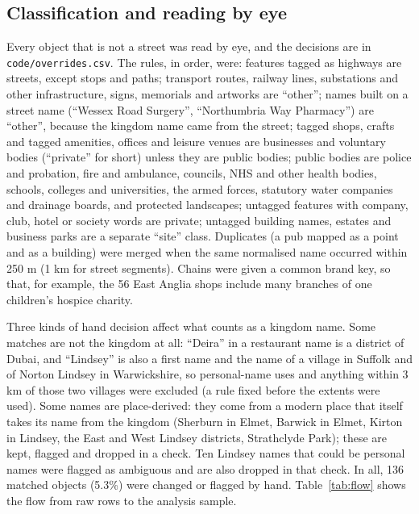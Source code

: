\documentclass[11pt,a4paper]{article}
\begin{document}
\subsection{Classification and reading by eye}
Every object that is not a street was read by eye, and the decisions are in \texttt{code/overrides.csv}. The rules, in order, were: features tagged as highways are streets, except stops and paths; transport routes, railway lines, substations and other infrastructure, signs, memorials and artworks are ``other''; names built on a street name (``Wessex Road Surgery'', ``Northumbria Way Pharmacy'') are ``other'', because the kingdom name came from the street; tagged shops, crafts and tagged amenities, offices and leisure venues are businesses and voluntary bodies (``private'' for short) unless they are public bodies; public bodies are police and probation, fire and ambulance, councils, NHS and other health bodies, schools, colleges and universities, the armed forces, statutory water companies and drainage boards, and protected landscapes; untagged features with company, club, hotel or society words are private; untagged building names, estates and business parks are a separate ``site'' class. Duplicates (a pub mapped as a point and as a building) were merged when the same normalised name occurred within 250 m (1 km for street segments). Chains were given a common brand key, so that, for example, the 56 East Anglia shops include many branches of one children's hospice charity.

Three kinds of hand decision affect what counts as a kingdom name. Some matches are not the kingdom at all: ``Deira'' in a restaurant name is a district of Dubai, and ``Lindsey'' is also a first name and the name of a village in Suffolk and of Norton Lindsey in Warwickshire, so personal-name uses and anything within 3 km of those two villages were excluded (a rule fixed before the extents were used). Some names are place-derived: they come from a modern place that itself takes its name from the kingdom (Sherburn in Elmet, Barwick in Elmet, Kirton in Lindsey, the East and West Lindsey districts, Strathclyde Park); these are kept, flagged and dropped in a check. Ten Lindsey names that could be personal names were flagged as ambiguous and are also dropped in that check. In all, 136 matched objects (5.3\%) were changed or flagged by hand. Table~\ref{tab:flow} shows the flow from raw rows to the analysis sample.
\end{document}
